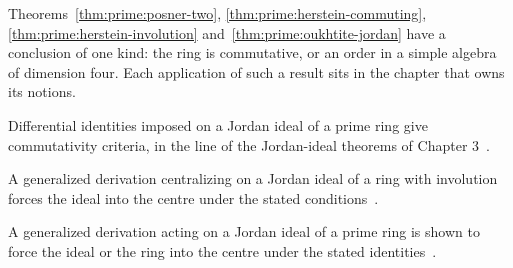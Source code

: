 Theorems~\ref{thm:prime:posner-two}, \ref{thm:prime:herstein-commuting},
\ref{thm:prime:herstein-involution} and~\ref{thm:prime:oukhtite-jordan} have
a conclusion of one kind: the ring is commutative, or an order in a simple algebra
of dimension four. Each application of such a result sits in the chapter that
owns its notions.

Differential identities imposed on a Jordan ideal of a prime ring give commutativity criteria, in the line of the Jordan-ideal theorems of Chapter 3~\cite{WlSomeCommutativityCriteria2019}.

A generalized derivation centralizing on a Jordan ideal of a ring with involution forces the ideal into the centre under the stated conditions~\cite{WlGeneralizedDerivationsCentrali2014}.

A generalized derivation acting on a Jordan ideal of a prime ring is shown to force the ideal or the ring into the centre under the stated identities~\cite{WlCommutativityOfPrimeRingsWithG2022}.
